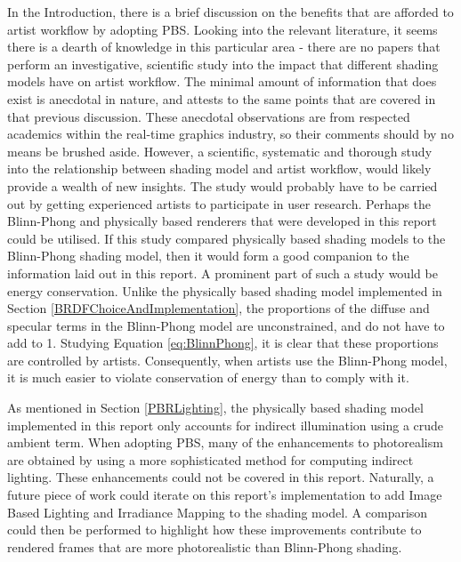 In the Introduction, there is a brief discussion on the benefits that are afforded to artist workflow by adopting PBS. Looking into the relevant literature, it seems there is a dearth of knowledge in this particular area - there are no papers that perform an investigative, scientific study into the impact that different shading models have on artist workflow. The minimal amount of information that does exist is anecdotal in nature, and attests to the same points that are covered in that previous discussion. These anecdotal observations are from respected academics within the real-time graphics industry, so their comments should by no means be brushed aside. However, a scientific, systematic and thorough study into the relationship between shading model and artist workflow, would likely provide a wealth of new insights. The study would probably have to be carried out by getting experienced artists to participate in user research. Perhaps the Blinn-Phong and physically based renderers that were developed in this report could be utilised. If this study compared physically based shading models to the Blinn-Phong shading model, then it would form a good companion to the information laid out in this report. A prominent part of such a study would be energy conservation. Unlike the physically based shading model implemented in Section \ref{BRDFChoiceAndImplementation}, the proportions of the diffuse and specular terms in the Blinn-Phong model are unconstrained, and do not have to add to 1. Studying Equation \ref{eq:BlinnPhong}, it is clear that these proportions are controlled by artists. Consequently, when artists use the Blinn-Phong model, it is much easier to violate conservation of energy than to comply with it.

As mentioned in Section \ref{PBRLighting}, the physically based shading model implemented in this report only accounts for indirect illumination using a crude ambient term. When adopting PBS, many of the enhancements to photorealism are obtained by using a more sophisticated method for computing indirect lighting. These enhancements could not be covered in this report. Naturally, a future piece of work could iterate on this report's implementation to add Image Based Lighting and Irradiance Mapping to the shading model. A comparison could then be performed to highlight how these improvements contribute to rendered frames that are more photorealistic than Blinn-Phong shading.